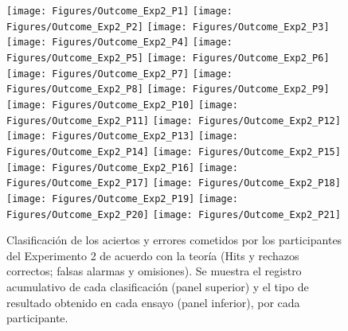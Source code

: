 \begin{figure}[th]
\centering
\texttt{[image: Figures/Outcome\_Exp2\_P1]} \texttt{[image: Figures/Outcome\_Exp2\_P2]} \texttt{[image: Figures/Outcome\_Exp2\_P3]}
\texttt{[image: Figures/Outcome\_Exp2\_P4]} \texttt{[image: Figures/Outcome\_Exp2\_P5]} \texttt{[image: Figures/Outcome\_Exp2\_P6]}
\texttt{[image: Figures/Outcome\_Exp2\_P7]} \texttt{[image: Figures/Outcome\_Exp2\_P8]} \texttt{[image: Figures/Outcome\_Exp2\_P9]}
\texttt{[image: Figures/Outcome\_Exp2\_P10]} \texttt{[image: Figures/Outcome\_Exp2\_P11]} \texttt{[image: Figures/Outcome\_Exp2\_P12]}
\texttt{[image: Figures/Outcome\_Exp2\_P13]} \texttt{[image: Figures/Outcome\_Exp2\_P14]} \texttt{[image: Figures/Outcome\_Exp2\_P15]}
\texttt{[image: Figures/Outcome\_Exp2\_P16]} \texttt{[image: Figures/Outcome\_Exp2\_P17]} \texttt{[image: Figures/Outcome\_Exp2\_P18]}
\texttt{[image: Figures/Outcome\_Exp2\_P19]} \texttt{[image: Figures/Outcome\_Exp2\_P20]} \texttt{[image: Figures/Outcome\_Exp2\_P21]} 
\caption[Resultados obtenidos por ensayo; Experimento 2]{Clasificación de los aciertos y errores cometidos por los participantes del Experimento 2 de acuerdo con la teoría (Hits y rechazos correctos; falsas alarmas y omisiones). Se muestra el registro acumulativo de cada clasificación (panel superior) y el tipo de resultado obtenido en cada ensayo (panel inferior), por cada participante.}
\label{fig:Outcome_E2}
\end{figure}












